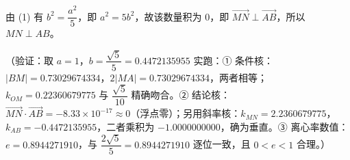 \begin{answer}
由 (1) 有 \(b^2=\dfrac{a^2}{5}\)，即 \(a^2=5b^2\)，故该数量积为 \(0\)，即 \(\overrightarrow{MN}\perp\overrightarrow{AB}\)，所以 \(MN\perp AB\)。

（验证：取 \(a=1\)，\(b=\dfrac{\sqrt{5}}{5}=0.4472135955\) 实跑：① 条件核：\(|BM|=0.73029674334\)，\(2|MA|=0.73029674334\)，两者相等；\(k_{OM}=0.22360679775\) 与 \(\dfrac{\sqrt{5}}{10}\) 精确吻合。② 结论核：\(\overrightarrow{MN}\cdot\overrightarrow{AB}=-8.33\times10^{-17}\approx0\)（浮点零）；另用斜率核：\(k_{MN}=2.2360679775\)，\(k_{AB}=-0.4472135955\)，二者乘积为 \(-1.0000000000\)，确为垂直。③ 离心率数值：\(e=0.8944271910\)，与 \(\dfrac{2\sqrt{5}}{5}=0.8944271910\) 逐位一致，且 \(0<e<1\) 合理。）



\end{answer}
